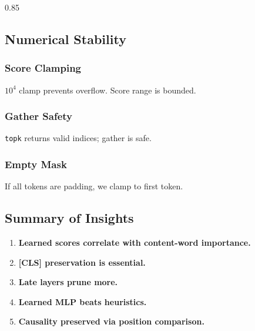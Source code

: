 0.85

\subsection{Numerical Stability}

\subsubsection{Score Clamping}

$10^4$ clamp prevents overflow. Score range is bounded.

\subsubsection{Gather Safety}

\texttt{topk} returns valid indices; gather is safe.

\subsubsection{Empty Mask}

If all tokens are padding, we clamp to first token.

\subsection{Summary of Insights}

\begin{enumerate}
\item \textbf{Learned scores correlate with content-word importance.}
\item \textbf{[CLS] preservation is essential.}
\item \textbf{Late layers prune more.}
\item \textbf{Learned MLP beats heuristics.}
\item \textbf{Causality preserved via position comparison.}

\end{enumerate}
